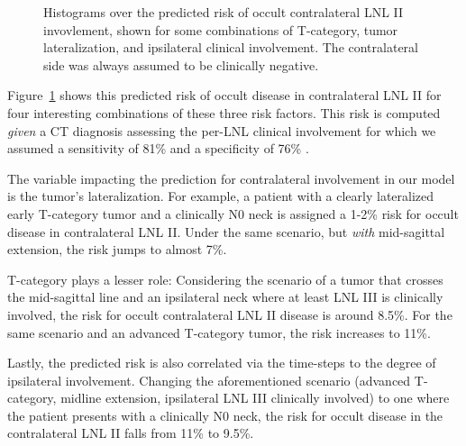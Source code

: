 \documentclass[
  sn-mathphys-num,
]{sn-jnl}
\begin{document}
\begin{figure}


\caption{\label{fig-model-risks}Histograms over the predicted risk of
occult contralateral LNL II invovlement, shown for some combinations of
T-category, tumor lateralization, and ipsilateral clinical involvement.
The contralateral side was always assumed to be clinically negative.}

\end{figure}%

Figure~\ref{fig-model-risks} shows this predicted risk of occult disease
in contralateral LNL II for four interesting combinations of these three
risk factors. This risk is computed \emph{given} a CT diagnosis
assessing the per-LNL clinical involvement for which we assumed a
sensitivity of 81\% and a specificity of 76\%
\citep{de_bondt_detection_2007}.

The variable impacting the prediction for contralateral involvement in
our model is the tumor's lateralization. For example, a patient with a
clearly lateralized early T-category tumor and a clinically N0 neck is
assigned a 1-2\% risk for occult disease in contralateral LNL II. Under
the same scenario, but \emph{with} mid-sagittal extension, the risk
jumps to almost 7\%.

T-category plays a lesser role: Considering the scenario of a tumor that
crosses the mid-sagittal line and an ipsilateral neck where at least LNL
III is clinically involved, the risk for occult contralateral LNL II
disease is around 8.5\%. For the same scenario and an advanced
T-category tumor, the risk increases to 11\%.

Lastly, the predicted risk is also correlated via the time-steps to the
degree of ipsilateral involvement. Changing the aforementioned scenario
(advanced T-category, midline extension, ipsilateral LNL III clinically
involved) to one where the patient presents with a clinically N0 neck,
the risk for occult disease in the contralateral LNL II falls from 11\%
to 9.5\%.
\end{document}
